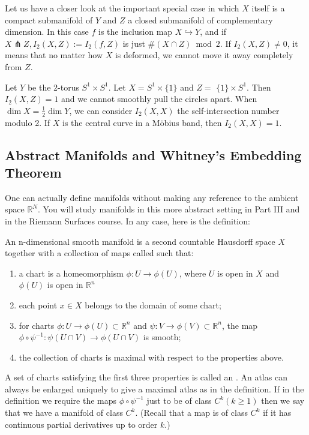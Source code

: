 Let us have a closer look at the important special case in which $X$ itself is a compact submanifold of $Y$ and $Z$ a closed submanifold of complementary dimension. In this case $f$ is the inclusion map $X \hookrightarrow Y$, and if $X \pitchfork Z, I_{2}(X, Z):=I_{2}(f, Z)$ is just $\#(X \cap Z) \bmod 2$. If $I_{2}(X, Z) \neq 0$, it means that no matter how $X$ is deformed, we cannot move it away completely from $Z$.

\begin{example}
    Let $Y$ be the 2-torus $S^{1} \times S^{1}$. Let $X=S^{1} \times\{1\}$ and $Z=$ $\{1\} \times S^{1}$. Then $I_{2}(X, Z)=1$ and we cannot smoothly pull the circles apart. When $\operatorname{dim} X=\frac{1}{2} \operatorname{dim} Y$, we can consider $I_{2}(X, X)$ the self-intersection number modulo 2. If $X$ is the central curve in a Möbius band, then $I_{2}(X, X)=1$.
\end{example}

\subsection{Abstract Manifolds and Whitney's Embedding Theorem}

One can actually define manifolds without making any reference to the ambient space $\mathbb{R}^{N}$. You will study manifolds in this more abstract setting in Part III and in the Riemann Surfaces course. In any case, here is the definition:

\begin{definition}
    An n-dimensional smooth manifold is a second countable Hausdorff space $X$ together with a collection of maps called  such that:
    \begin{enumerate}
        \item a chart is a homeomorphism $\phi: U \rightarrow \phi(U)$, where $U$ is open in $X$ and $\phi(U)$ is open in $\mathbb{R}^{n}$
        \item each point $x \in X$ belongs to the domain of some chart;
        \item for charts $\phi: U \rightarrow \phi(U) \subset \mathbb{R}^{n}$ and $\psi: V \rightarrow \phi(V) \subset \mathbb{R}^{n}$, the map $\phi \circ \psi^{-1}: \psi(U \cap V) \rightarrow \phi(U \cap V)$ is smooth;
        \item the collection of charts is maximal with respect to the properties above.
    \end{enumerate}
    A set of charts satisfying the first three properties is called an . An atlas can always be enlarged uniquely to give a maximal atlas as in the definition. If in the definition we require the maps $\phi \circ \psi^{-1}$ just to be of class $C^{k}(k \geq 1)$ then we say that we have a manifold of class $C^{k}$. (Recall that a map is of class $C^{k}$ if it has continuous partial derivatives up to order $k$.)
\end{definition}

